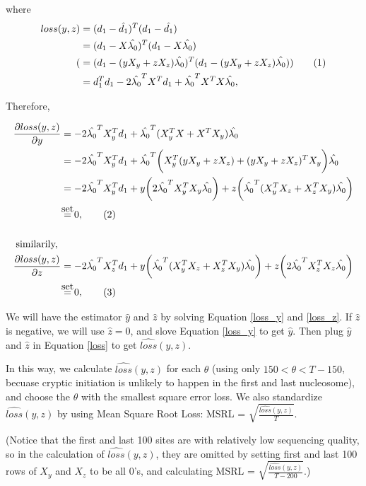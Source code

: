 \documentclass{article}
\newcommand\myset{\stackrel{\mathclap{\normalfont\mbox{set}}}{=}}
\newcommand\numberthis{\addtocounter{equation}{1}\tag{\theequation}}
\begin{document}
where 
\begin{align*}
loss(y,z) &= (d_1-\hat{d_1})^T(d_1-\hat{d_1})\\
&=(d_1-X\hat{\lambda_0})^T(d_1-X\hat{\lambda_0})\\
(&=(d_1-(yX_y+zX_z)\hat{\lambda_0})^T(d_1-(yX_y+zX_z)\hat{\lambda_0})) \numberthis \label{loss}\\
&=d_1^T d_1 -2\hat{\lambda_0}^T X^T d_1 + \hat{\lambda_0}^T X^T X \hat{\lambda_0}, \\
\end{align*}

Therefore,

\begin{align*}
\frac{\partial loss(y,z)}{\partial y} &=-2\hat{\lambda_0}^T X_y^T d_1 + \hat{\lambda_0}^T (X_y^T X + X^T X_y) \hat{\lambda_0}\\
&= -2\hat{\lambda_0}^T X_y^T d_1 + \hat{\lambda_0}^T \bigg(X_y^T (yX_y+zX_z) + (yX_y+zX_z)^T X_y\bigg) \hat{\lambda_0}\\
&= -2\hat{\lambda_0}^T X_y^T d_1 + y \bigg( 2\hat{\lambda_0}^T X_y^T X_y \hat{\lambda_0}  \bigg) + z \bigg( \hat{\lambda_0}^T (X_y^T X_z+X_z^T X_y) \hat{\lambda_0}  \bigg) \\
&\myset 0,\numberthis \label{loss_y}\\
\\
\text{similarily, }\\
\frac{\partial loss(y,z)}{\partial z} &= -2\hat{\lambda_0}^T X_z^T d_1 + y \bigg( \hat{\lambda_0}^T (X_y^T X_z+X_z^T X_y) \hat{\lambda_0}  \bigg) + z \bigg( 2\hat{\lambda_0}^T X_z^T X_z \hat{\lambda_0}  \bigg) \\
 &\myset 0,\numberthis \label{loss_z}
\end{align*}

We will have the estimator $\hat{y}$ and $\hat{z}$ by solving Equation \ref{loss_y} and \ref{loss_z}. If $\hat{z}$ is negative, we will use $\hat{z}=0$, and slove Equation \ref{loss_y} to get $\hat{y}$. Then plug $\hat{y}$ and $\hat{z}$ in Equation \ref{loss} to get $\hat{loss}(y,z)$.


In this way, we calculate $\hat{loss}(y,z)$ for each $\theta$ (using only $150 < \theta < T-150$, becuase cryptic initiation is unlikely to happen in the first and last nucleosome), and choose the $\theta$ with the smallest square error loss. We also standardize $\hat{loss}(y,z)$ by using  Mean Square Root Loss: MSRL = $\sqrt{\frac{\hat{loss}(y,z)}{T}}$.


(Notice that the first and last 100 sites are with relatively low sequencing quality, so in the calculation of $\hat{loss}(y,z)$, they are omitted by setting first and last 100 rows of $X_y$ and $X_z$ to be all 0's, and calculating MSRL = $\sqrt{\frac{\hat{loss}(y,z)}{T-200}}$.)
\end{document}

